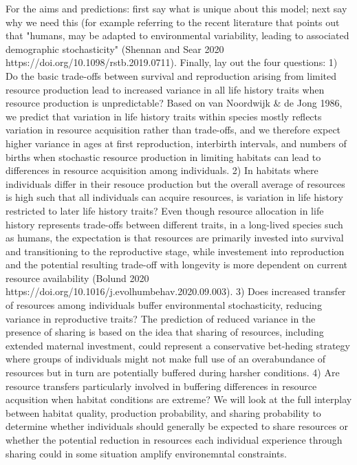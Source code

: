 \documentclass{article}
\begin{document}
For the aims and predictions: first say what is unique about this model; next say why we need this (for example referring to the recent literature that points out that "humans, may be adapted to environmental variability, leading to associated demographic stochasticity" (Shennan and Sear 2020 https://doi.org/10.1098/rstb.2019.0711). Finally, lay out the four questions: 1) Do the basic trade-offs between survival and reproduction arising from limited resource production lead to increased variance in all life history traits when resource production is unpredictable? Based on van Noordwijk & de Jong 1986, we predict that variation in life history traits within species mostly reflects variation in resource acquisition rather than trade-offs, and we therefore expect higher variance in ages at first reproduction, interbirth intervals, and numbers of births when stochastic resource production in limiting habitats can lead to differences in resource acquisition among individuals. 2) In habitats where individuals differ in their resouce production but the overall average of resources is high such that all individuals can acquire resources, is variation in life history restricted to later life history traits? Even though resource allocation in life history represents trade-offs between different traits, in a long-lived species such as humans, the expectation is that resources are primarily invested into survival and transitioning to the reproductive stage, while investement into reproduction and the potential resulting trade-off with longevity is more dependent on current resource availability (Bolund 2020 https://doi.org/10.1016/j.evolhumbehav.2020.09.003). 3) Does increased transfer of resources among individuals buffer environmental stochasticity, reducing variance in reproductive traits? The prediction of reduced variance in the presence of sharing is based on the idea that sharing of resources, including extended maternal investment, could represent a conservative bet-heding strategy where groups of individuals might not make full use of an overabundance of resources but in turn are potentially buffered during harsher conditions. 4) Are resource transfers particularly involved in buffering differences in resource acqusition when habitat conditions are extreme? We will look at the full interplay between habitat quality, production probability, and sharing probability to determine whether individuals should generally be expected to share resources or whether the potential reduction in resources each individual experience through sharing could in some situation amplify environemntal constraints.
\end{document}
